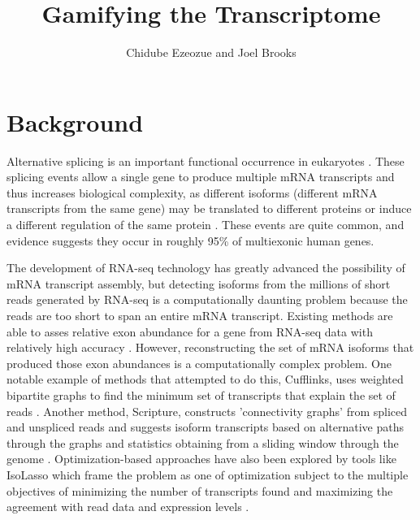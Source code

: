 \documentclass[12pt]{article}
\title{Gamifying the Transcriptome}
\author{Chidube Ezeozue and Joel Brooks}
\begin{document}

\renewcommand\refname{Bibliography}
\maketitle

\begin{abstract}

\end{abstract}

\section{Background}
Alternative splicing is an important functional occurrence in eukaryotes \citep{pan2008deep}. These splicing events allow a single gene to produce multiple mRNA transcripts and thus increases biological complexity, as different isoforms (different mRNA transcripts from the same gene) may be translated to different proteins or induce a different regulation of the same protein \citep{trapnell2010transcript}. These events are quite common, and evidence suggests they occur in roughly 95\% of multiexonic human genes.

The development of RNA-seq technology has greatly advanced the possibility of mRNA transcript assembly, but detecting isoforms from the millions of short reads generated by RNA-seq is a computationally daunting problem because the reads are too short to span an entire mRNA transcript. Existing methods are able to asses relative exon abundance for a gene from RNA-seq data with relatively high accuracy \citep{trapnell2009tophat}. However, reconstructing the set of mRNA isoforms that produced those exon abundances is a computationally complex problem. One notable example of methods that attempted to do this, Cufflinks, uses weighted bipartite graphs to find the minimum set of transcripts that explain the set of reads \citep{trapnell2010transcript}. Another method, Scripture, constructs 'connectivity graphs' from spliced and unspliced reads and suggests isoform transcripts based on alternative paths through the graphs and statistics obtaining from a sliding window through the genome \citep{guttman2010ab}. Optimization-based approaches have also been explored by tools like IsoLasso which frame the problem as one of optimization subject to the multiple objectives of minimizing the number of transcripts found and maximizing the agreement with read data and expression levels \citep{li2011isolasso}.
\end{document}

